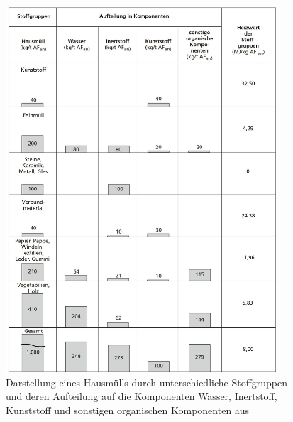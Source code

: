 \begin{figure}[h!]
	\centering
	\includegraphics[width=0.90\textwidth]{img/ThermischeVerfahren}
	\caption[Darstellung eines Hausmülls durch unterschiedliche Stoffgruppen und deren Aufteilung auf die Komponenten Wasser, Inertstoff, Kunststoff und sonstigen organischen Komponenten]{Darstellung eines Hausmülls durch unterschiedliche Stoffgruppen und deren Aufteilung auf die Komponenten Wasser, Inertstoff, Kunststoff und sonstigen organischen Komponenten aus \cite[S.23]{scholz2013}}
	\label{fig:ersatzbrennstoffe}
\end{figure}
\FloatBarrier

 

